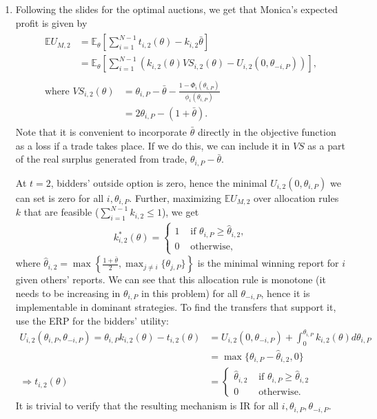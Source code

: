 \documentclass[a4paper]{article}
\begin{document}
\begin{enumerate}
	\item Following the slides for the optimal auctions, we get that Monica's expected profit is given by
	\begin{gather}
		\begin{aligned} 
			\mathbb{E}U_{M,2} &= \mathbb{E}_\theta \left[ \sum_{i=1}^{N-1} t_{i,2}(\theta) - k_{i,2} \bar{\theta} \right]
			\\
			&= \mathbb{E}_\theta \left[ \sum_{i=1}^{N-1} \left(k_{i,2}(\theta) VS_{i,2}(\theta) - U_{i,2}(0,\theta_{-i,P})\right) \right],
			\label{eq:carauction}
		\end{aligned}
		\\
		\nonumber
		\begin{aligned} 
		\text{where } VS_{i,2}(\theta) &= \theta_{i,P} - \bar{\theta} - \frac{1-\Phi_i(\theta_{i,P})}{\phi_i(\theta_{i,P})}
		\\
		&= 2\theta_{i,P} - (1+\bar{\theta}).
		\end{aligned}
	\end{gather}
	Note that it is convenient to incorporate $\bar{\theta}$ directly in the objective function as a loss if a trade takes place. If we do this, we can include it in $VS$ as a part of the real surplus generated from trade, $\theta_{i,P} - \bar{\theta}$.
	
	At $t=2$, bidders' outside option is zero, hence the minimal $U_{i,2}(0,\theta_{i,P})$ we can set is zero for all $i,\theta_{i,P}$. Further, maximizing $\mathbb{E}U_{M,2}$ over allocation rules $k$ that are feasible ($\sum_{i=1}^{N-1}k_{i,2} \leq 1$), we get
	\begin{align*}
		k_{i,2}^*(\theta) = \begin{cases}
			1 & \text{ if } \theta_{i,P} \geq \hat{\theta}_{i,2},
			\\
			0 & \text{ otherwise},
		\end{cases}
	\end{align*}
	where $\hat{\theta}_{i,2} = \max \left\{\frac{1+\bar{\theta}}{2}, \max_{j \neq i} \{ \theta_{j,P} \} \right\}$ is the minimal winning report for $i$ given others' reports.
	We can see that this allocation rule is monotone (it needs to be increasing in $\theta_{i,P}$ in this problem) for all $\theta_{-i,P}$, hence it is implementable in dominant strategies. To find the transfers that support it, use the ERP for the bidders' utility: 
	\begin{align*}
		U_{i,2}(\theta_{i,P},\theta_{-i,P}) = \theta_{i,P} k_{i,2}(\theta) - t_{i,2}(\theta) &= U_{i,2}(0,\theta_{-i,P}) + \int_0^{\theta_{i,P}} k_{i,2}(\theta) d\theta_{i,P}
		\\
		&= \max \{ \theta_{i,P} - \hat{\theta}_{i,2}, 0 \}
		\\
		\Rightarrow t_{i,2}(\theta) &= \begin{cases}
			\hat{\theta}_{i,2} & \text{ if } \theta_{i,P} \geq \hat{\theta}_{i,2}
			\\
			0 & \text{ otherwise}.
		\end{cases}
	\end{align*}
	It is trivial to verify that the resulting mechanism is IR for all $i,\theta_{i,P},\theta_{-i,P}$.
	

\end{enumerate}
\end{document}
